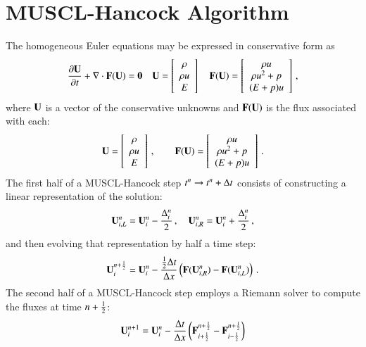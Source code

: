 \section{MUSCL-Hancock Algorithm}

The homogeneous Euler equations may be expressed in conservative form as
\begin{equation}
\frac{\partial \mathbf{U}}{\partial t} + \nabla\cdot\mathbf{F}(\mathbf{U}) = \mathbf{0}\quad
\mathbf{U}=\left[\begin{array}{c}\rho\\\rho u\\E\end{array}\right]\quad
\mathbf{F}(\mathbf{U})=\left[\begin{array}{c}\rho u\\
  \rho u^2 + p\\
  (E+p)u\end{array}\right] \, ,
\end{equation}
where $\mathbf{U}$ is a vector of the conservative unknowns
and $\mathbf{F}(\mathbf{U})$ is the flux associated with each:
\begin{equation}
\mathbf{U}=\left[\begin{array}{c}\rho\\\rho u\\E\end{array}\right] \, ,\qquad
\mathbf{F}(\mathbf{U})=\left[\begin{array}{c}\rho u\\
  \rho u^2 + p\\
  (E+p)u\end{array}\right] \, .
\end{equation}
The first half of a MUSCL-Hancock step $t^n\rightarrow t^n+\Delta t$
consists of constructing a linear representation of the solution:
\begin{equation}
  \mathbf{U}_{i,L}^n = \mathbf{U}_i^n - \frac{\Delta_i^n}{2} \, ,
  \quad
  \mathbf{U}_{i,R}^n = \mathbf{U}_i^n + \frac{\Delta_i^n}{2} \, ,
\end{equation}
and then evolving that representation by half a time step:
\begin{equation}
  \mathbf{U}_i^{n+\frac{1}{2}} = \mathbf{U}_i^n - \frac{\frac{1}{2}\Delta t}{\Delta x}
  \left(\mathbf{F}(\mathbf{U}_{i,R}^n) - \mathbf{F}(\mathbf{U}_{i,L}^n)\right) \, .
\end{equation}
The second half of a MUSCL-Hancock step employs a Riemann solver
to compute the fluxes at time $n+\frac{1}{2}$:
\begin{equation}
  \mathbf{U}_i^{n+1} = \mathbf{U}_i^n - \frac{\Delta t}{\Delta x}
  \left(\mathbf{F}_{i+\frac{1}{2}}^{n+\frac{1}{2}} - \mathbf{F}_{i-\frac{1}{2}}^{n+\frac{1}{2}}\right)
\end{equation}
